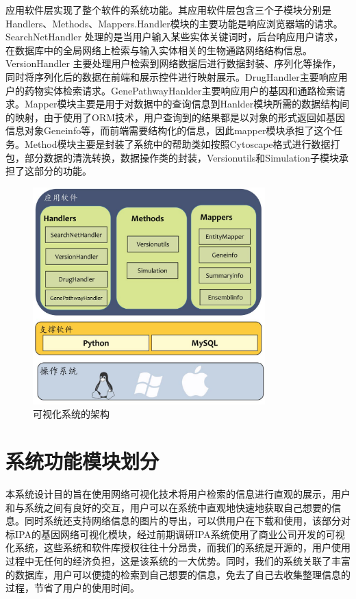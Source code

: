 应用软件层实现了整个软件的系统功能。其应用软件层包含三个子模块分别是Handlers、Methods、Mappers.Handler模块的主要功能是响应浏览器端的请求。SearchNetHandler 处理的是当用户输入某些实体关键词时，后台响应用户请求，在数据库中的全局网络上检索与输入实体相关的生物通路网络结构信息。VersionHandler 主要处理用户检索到网络数据后进行数据封装、序列化等操作，同时将序列化后的数据在前端和展示控件进行映射展示。DrugHandler主要响应用户的药物实体检索请求。GenePathwayHanlder主要响应用户的基因和通路检索请求。Mapper模块主要是用于对数据中的查询信息到Hanlder模块所需的数据结构间的映射，由于使用了ORM技术，用户查询到的结果都是以对象的形式返回如基因信息对象Geneinfo等，而前端需要结构化的信息，因此mapper模块承担了这个任务。Method模块主要是封装了系统中的帮助类如按照Cytoscape格式进行数据打包，部分数据的清洗转换，数据操作类的封装，Versionutils和Simulation子模块承担了这部分的功能。
\begin{figure}[h]
\centering
\includegraphics[width = 0.8\textwidth]{framework}
\caption[fig31]{可视化系统的架构}
\label{fig31}
\end{figure}

\section{系统功能模块划分}
本系统设计目的旨在使用网络可视化技术将用户检索的信息进行直观的展示，用户和与系统之间有良好的交互，用户可以在系统中直观地快速地获取自己想要的信息。同时系统还支持网络信息的图片的导出，可以供用户在下载和使用，该部分对标IPA的基因网络可视化模块，经过前期调研IPA系统使用了商业公司开发的可视化系统，这些系统和软件库授权往往十分昂贵，而我们的系统是开源的，用户使用过程中无任何的经济负担，这是该系统的一大优势。同时，我们的系统关联了丰富的数据库，用户可以便捷的检索到自己想要的信息，免去了自己去收集整理信息的过程，节省了用户的使用时间。

